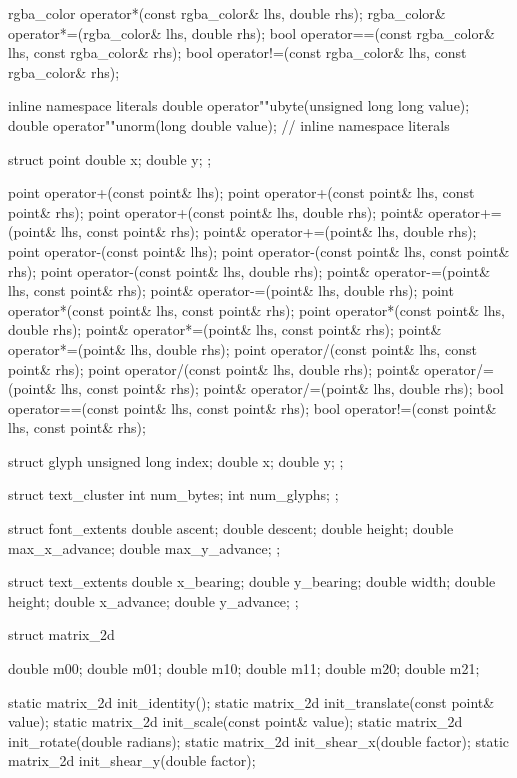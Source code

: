 \begin{codeblock}
{{{{  rgba_color operator*(const rgba_color& lhs, double rhs);
  rgba_color& operator*=(rgba_color& lhs, double rhs);
  bool operator==(const rgba_color& lhs, const rgba_color& rhs);
  bool operator!=(const rgba_color& lhs, const rgba_color& rhs);

  inline namespace literals {
    double operator""ubyte(unsigned long long value);
    double operator""unorm(long double value);
  } // inline namespace literals
  
  struct point {
    double x;
    double y;
  };

  point operator+(const point& lhs);
  point operator+(const point& lhs, const point& rhs);
  point operator+(const point& lhs, double rhs);
  point& operator+=(point& lhs, const point& rhs);
  point& operator+=(point& lhs, double rhs);
  point operator-(const point& lhs);
  point operator-(const point& lhs, const point& rhs);
  point operator-(const point& lhs, double rhs);
  point& operator-=(point& lhs, const point& rhs);
  point& operator-=(point& lhs, double rhs);
  point operator*(const point& lhs, const point& rhs);
  point operator*(const point& lhs, double rhs);
  point& operator*=(point& lhs, const point& rhs);
  point& operator*=(point& lhs, double rhs);
  point operator/(const point& lhs, const point& rhs);
  point operator/(const point& lhs, double rhs);
  point& operator/=(point& lhs, const point& rhs);
  point& operator/=(point& lhs, double rhs);
  bool operator==(const point& lhs, const point& rhs);
  bool operator!=(const point& lhs, const point& rhs);

  struct glyph {
    unsigned long index;
    double x;
    double y;
  };

  struct text_cluster {
    int num_bytes;
    int num_glyphs;
  };

  struct font_extents {
    double ascent;
    double descent;
    double height;
    double max_x_advance;
    double max_y_advance;
  };

  struct text_extents {
    double x_bearing;
    double y_bearing;
    double width;
    double height;
    double x_advance;
    double y_advance;
  };

  struct matrix_2d {
    double m00;
    double m01;
    double m10;
    double m11;
    double m20;
    double m21;

    static matrix_2d init_identity();
    static matrix_2d init_translate(const point& value);
    static matrix_2d init_scale(const point& value);
    static matrix_2d init_rotate(double radians);
    static matrix_2d init_shear_x(double factor);
    static matrix_2d init_shear_y(double factor);

}}}}}
\end{codeblock}
